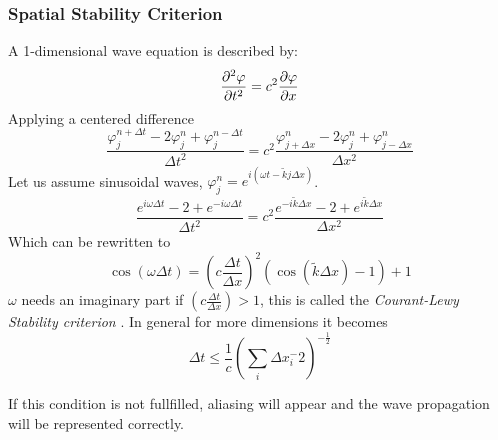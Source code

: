     \subsubsection{Spatial Stability Criterion}
        A 1-dimensional wave equation is described by:
        \begin{equation}
                \pdv[2]{\varphi}{t} = c^2 \pdv{\varphi}{x}
        \end{equation}
        Applying a centered difference
        \begin{equation}
            \frac{\varphi^{n + \Delta t}_{j} - 2 \varphi^{n}_{j} + \varphi^{n - \Delta t}_{j}}{\Delta t^2}
            =
            c^2\frac{\varphi^n_{j+\Delta x} - 2\varphi^n_{j} + \varphi^n_{j-\Delta x}}{\Delta x^2}
        \end{equation}
        Let us assume sinusoidal waves, \(\varphi^n_j = e^{i(\omega t  - \tilde{k}j\Delta x)}\).
        \begin{equation}
            \frac{e^{i\omega \Delta t} - 2 +e^{-i\omega \Delta t} }{\Delta t^2}
            = c^2 \frac{e^{-i\tilde k \Delta x} - 2 + e^{i\tilde k \Delta x}}{\Delta x ^2}
        \end{equation}
        Which can be rewritten to
        \begin{equation}
            \cos(\omega \Delta t) = \left(c\frac{\Delta t}{\Delta x}\right)^2\left(\cos(\tilde k \Delta x) - 1 \right) + 1
        \end{equation}
        \(\omega\) needs an imaginary part if \( \left(c\frac{\Delta t}{\Delta x}\right)>1\), this is called the \textit{Courant-Lewy Stability criterion}
        \citep{courant_uber_1869}. In general for more dimensions it becomes
        \begin{equation}
            \Delta t \leq \frac{1}{c} \left(\sum_i\Delta x_i^-2\right)^{-\frac{1}{2}}
        \end{equation}

		If this condition is not fullfilled, aliasing will appear and the wave propagation will be represented correctly.

